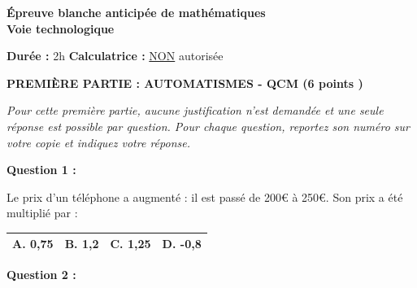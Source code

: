 \documentclass[12pt,a4paper]{exam}
\begin{document}
\begin{mdframed}[
    linewidth=0.5pt,
    roundcorner=5pt,
]
\begin{center}
    \Large\textbf{Épreuve blanche anticipée de mathématiques\\Voie technologique}
\end{center}

\vspace{0.3cm}

\noindent
\textbf{Durée :} 2h \hfill
\textbf{Calculatrice :} \underline{NON} autorisée
\end{mdframed}

\vspace{1pt}

\begin{center}
    \textbf{PREMIÈRE PARTIE : AUTOMATISMES - QCM (6 points )}
\end{center}

\textit{Pour cette première partie, aucune justification n’est demandée et une seule réponse est possible
par question. Pour chaque question, reportez son numéro sur votre copie et indiquez votre réponse.}

\vspace{10pt}

\textbf{Question 1 :}
\vspace{5pt}

Le prix d'un téléphone a augmenté : il est passé de 200€ à 250€. Son prix a été multiplié par :

\begin{center}
    \renewcommand{\arraystretch}{3}
    \begin{tabular}{|m{3.4cm}|m{3.4cm}|m{3.4cm}|m{3.4cm}|}
    \hline
    \centering \vspace{-0.3cm} \textbf{A.} 0,75 & 
    \centering \vspace{-0.3cm} \textbf{B.} 1,2 & 
    \centering \vspace{-0.3cm} \textbf{C.} 1,25 & 
    \centering \vspace{-0.3cm} \textbf{D.} -0,8 \tabularnewline
    \hline
    \end{tabular}
\end{center}

\vspace{10pt}

\textbf{Question 2 :}
\vspace{5pt}
\end{document}
